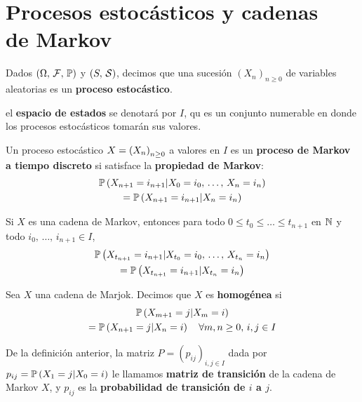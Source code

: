 \section{Procesos estocásticos y cadenas\\
de Markov}
\begin{definition}
Dados $(\om,\, \cal{F},\, \prob)$ y $(S,\, \cal{S})$, decimos que una sucesión $(X_n)_{n\geq0}$ de variables aleatorias es un \textbf{proceso estocástico}.
\end{definition}

\begin{definition}
el \textbf{espacio de estados} se denotará por $I$, qu es un conjunto numerable en donde los procesos estocásticos tomarán sus valores.
\end{definition}


\begin{definition}
Un proceso estocástico $X = \suc{X}$ a valores en $I$ es un \textbf{proceso de Markov a tiempo discreto} si satisface la \textbf{propiedad de Markov}:
\begin{multline}
    \probf{X_{n+1} = i_{n+1} | X_0 = i_0,\, \ldots,\, X_n = i_n} \\
    = \probf{X_{n+1} = i_{n+1} | X_n = i_n}
\end{multline}
\end{definition}

\begin{proposition}
Si $X$ es una cadena de Markov, entonces para todo $0 \leq t_0 \leq \ldots \leq t_{n+1}$ en $\N$ y todo $i_0,\, \ldots,\, i_{n+1} \in I$,
\begin{multline}
    \probf{X_{t_{n+1}} = i_{n+1} | X_{t_{0}} = i_0,\, \ldots,\, X_{t_{n}} = i_n} \\
    = \probf{X_{t_{n+1}} = i_{n+1} | X_{t_n} = i_n}
\end{multline}
\end{proposition}

\begin{definition}
Sea $X$ una cadena de Marjok. Decimos que $X$ es \textbf{homogénea} si
\begin{multline}
    \probf{X_{m+1} = j | X_m = i}\\
    = \probf{X_{n+1} = j | X_n = i} \quad \forall m, n \geq 0,\, i, j \in I
\end{multline}
\end{definition}

\begin{definition}
De la definición anterior, la matriz $P = (p_{ij})_{i,j \in I}$ dada por $p_{ij} = \probf{X_1 = j | X_0 = i}$ le llamamos \textbf{matriz de transición} de la cadena de Markov $X$, y $p_{ij}$ es la \textbf{probabilidad de transición de $i$ a $j$}.
\end{definition}

